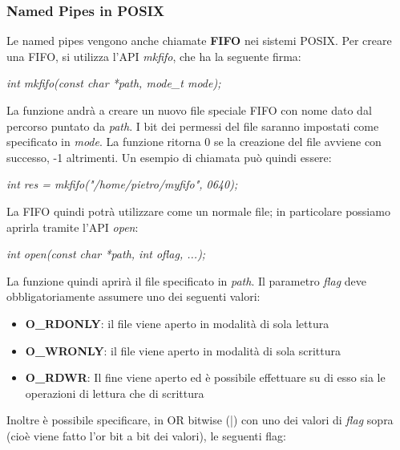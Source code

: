 \documentclass[12pt]{article}
\begin{document}
\subsubsection{Named Pipes in POSIX}
Le named pipes vengono anche chiamate \textbf{FIFO} nei sistemi POSIX. Per creare una FIFO, si utilizza l'API \textit{mkfifo}, che ha la seguente firma:
\begin{center}
    \textit{int mkfifo(const char *path, mode\_t mode);}
\end{center}
La funzione andrà a creare un nuovo file speciale FIFO con nome dato dal percorso puntato da \textit{path}.
I bit dei permessi del file saranno impostati come specificato in \textit{mode}.
La funzione ritorna 0 se la creazione del file avviene con successo, -1 altrimenti.
Un esempio di chiamata può quindi essere:
\begin{center}
    \textit{int res = mkfifo("/home/pietro/myfifo", 0640);}
\end{center}
La FIFO quindi potrà utilizzare come un normale file; in particolare possiamo aprirla tramite l'API \textit{open}:
\begin{center}
    \textit{int open(const char *path, int oflag, ...);}
\end{center}
La funzione quindi aprirà il file specificato in \textit{path}.
Il parametro \textit{flag} deve obbligatoriamente assumere uno dei seguenti valori:
\begin{itemize}
    \item \textbf{O\_RDONLY}: il file viene aperto in modalità di sola lettura
    \item \textbf{O\_WRONLY}: il file viene aperto in modalità di sola scrittura
    \item \textbf{O\_RDWR}: Il fine viene aperto ed è possibile effettuare su di esso sia le operazioni di lettura che di scrittura
\end{itemize}
Inoltre è possibile specificare, in OR bitwise (|) con uno dei valori di \textit{flag} sopra (cioè viene fatto l'or bit a bit dei valori), le seguenti flag:
\end{document}
